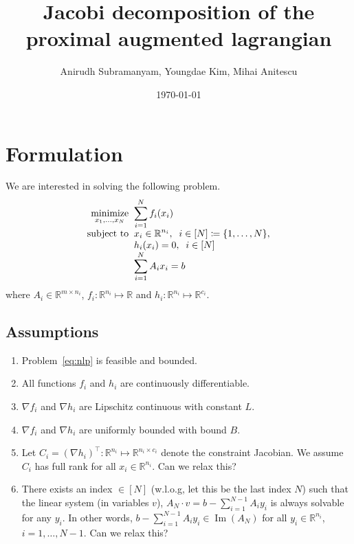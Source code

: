 \documentclass[11pt]{article}
\title{Jacobi decomposition of the proximal augmented lagrangian}
\author{Anirudh Subramanyam, Youngdae Kim, Mihai Anitescu}
\date{\today}
\newcommand{\comment}[1]{{\color{red}#1}}
\newcommand{\Image}[1]{\mathop{\text{Im}}\left(#1\right)}
\begin{document}
\maketitle

\section{Formulation}
We are interested in solving the following problem.
\begin{equation}\label{eq:nlp}
\begin{array}{r@{\;\;}l}
\displaystyle\mathop{\text{minimize}}_{x_1, \ldots, x_N} & \displaystyle \sum_{i = 1}^N f_i(x_i) \\
\text{subject to} & \displaystyle x_i \in \mathbb{R}^{n_i}, \;\; i \in [N] \coloneqq \{1, \ldots, N\}, \\
& \displaystyle h_i(x_i) = 0, \;\; i \in [N] \\
& \displaystyle \sum_{i = 1}^N A_i x_i = b
\end{array}
\end{equation}
where $A_i \in \mathbb{R}^{m \times n_i}$, $f_i: \mathbb{R}^{n_i} \mapsto \mathbb{R}$ and $h_i :\mathbb{R}^{n_i} \mapsto \mathbb{R}^{c_i}$. %

\subsection{Assumptions}
\begin{enumerate}
    \item\label{assume:feasible}
    Problem~\eqref{eq:nlp} is feasible and bounded.
    \item\label{assume:differentiable}
    All functions $f_i$ and $h_i$ are continuously differentiable. 
    \item\label{assume:lipschitz}
    $\nabla f_i$ and $\nabla h_i$ are Lipschitz continuous with constant $L$.
    \item\label{assume:bounded}
    $\nabla f_i$ and $\nabla h_i$ are uniformly bounded with bound $B$.
    \item\label{assume:licq}
    Let $C_i = (\nabla h_i)^\top : \mathbb{R}^{n_i} \mapsto \mathbb{R}^{n_i \times c_i}$ denote the constraint Jacobian. We assume $C_i$ has full rank for all $x_i \in \mathbb{R}^{n_i}$. \comment{Can we relax this?}
    \item\label{assume:coupling}
    There exists an index $\in [N]$ (w.l.o.g, let this be the last index $N$) such that the linear system (in variables $v$), $A_N \cdot v = b - \sum_{i = 1}^{N-1} A_i y_i$ is always solvable for any $y_i$. In other words, $b - \sum_{i = 1}^{N-1} A_i y_i \in \Image{A_N}$ for all $y_i \in \mathbb{R}^{n_i}$,  $i = 1, \ldots, N-1$. \comment{Can we relax this?}
\end{enumerate}
\end{document}
